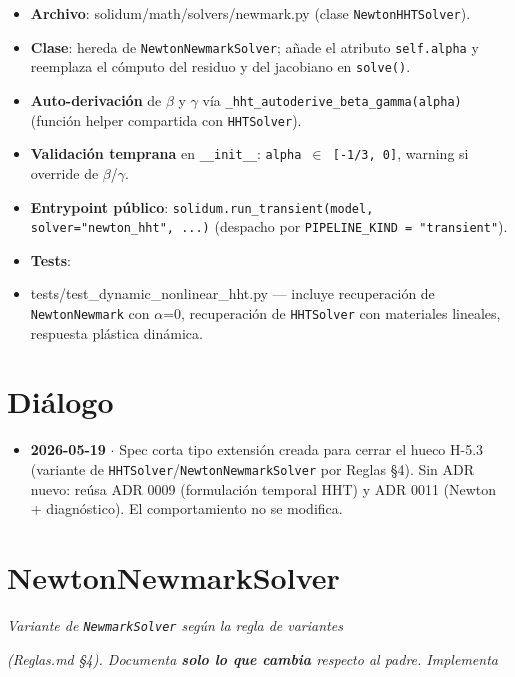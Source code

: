 \documentclass[11pt,letterpaper,oneside]{report}
\begin{document}
\begin{itemize}
  \item \textbf{Archivo}: solidum/math/solvers/newmark.py (clase \texttt{NewtonHHTSolver}).
  \item \textbf{Clase}: hereda de \texttt{NewtonNewmarkSolver}; añade el atributo \texttt{self.alpha} y reemplaza el cómputo del residuo y del jacobiano en \texttt{solve()}.
  \item \textbf{Auto-derivación} de \ensuremath{\beta} y \ensuremath{\gamma} vía \texttt{\_hht\_autoderive\_beta\_gamma(alpha)} (función helper compartida con \texttt{HHTSolver}).
  \item \textbf{Validación temprana} en \texttt{\_\_init\_\_}: \texttt{alpha \ensuremath{\in} [-1/3, 0]}, warning si override de \ensuremath{\beta}/\ensuremath{\gamma}.
  \item \textbf{Entrypoint público}: \texttt{solidum.run\_transient(model, solver="newton\_hht", ...)} (despacho por \texttt{PIPELINE\_KIND = "transient"}).
  \item \textbf{Tests}:
  \item tests/test\_dynamic\_nonlinear\_hht.py --- incluye recuperación de \texttt{NewtonNewmark} con \ensuremath{\alpha}=0, recuperación de \texttt{HHTSolver} con materiales lineales, respuesta plástica dinámica.
\end{itemize}


\section{Diálogo}

\begin{itemize}
  \item \textbf{2026-05-19} \ensuremath{\cdot} Spec corta tipo extensión creada para cerrar el hueco H-5.3 (variante de \texttt{HHTSolver}/\texttt{NewtonNewmarkSolver} por Reglas §4). Sin ADR nuevo: reúsa ADR 0009 (formulación temporal HHT) y ADR 0011 (Newton + diagnóstico). El comportamiento no se modifica.
\end{itemize}


\newpage

\section{NewtonNewmarkSolver}



\textit{Variante de \texttt{NewmarkSolver} según la regla de variantes}

\textit{(Reglas.md §4). Documenta \textbf{solo lo que cambia} respecto al padre. Implementa}
\end{document}

